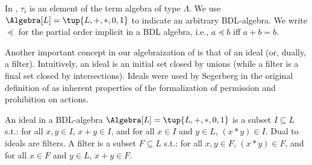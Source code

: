 \medskip
{}

In , $\tau_i$ is an element of the term algebra of type $\Lambda$.
We use $\Algebra[L] = \tup{L, {+}, {*}, {0}, {1}}$ to indicate an arbitrary BDL-algebra.
We write $\preccurlyeq$ for the partial order implicit in a BDL algebra, i.e., $a \preccurlyeq b$ iff $a + b = b$.

\medskip
Another important concept in our algebraization of \DAL is that of an ideal (or, dually, a filter).
Intuitively, an ideal is an initial set closed by unions (while a filter is a final set closed by intersections).  
Ideals were used by Segerberg in the original definition of \DAL as inherent properties of the formalization of permission and prohibition on actions.

\medskip
\begin{definition}
	An ideal in a BDL-algebra $\Algebra[L] = \tup{L, {+}, {*}, {0}, {1}}$ is a subset $I \subseteq L$ s.t.: for all $x,y \in I$, ${x + y} \in I$,
	and for all $x \in I$ and $y \in L$, $(x*y) \in I$.
	Dual to ideals are filters.
	A filter is a subset $F \subseteq L$ s.t.: for all $x,y \in F$, $(x*y) \in F$, and 
	for all $x \in F$ and $y \in L$, ${x + y} \in F$.
\end{definition}
\medskip

